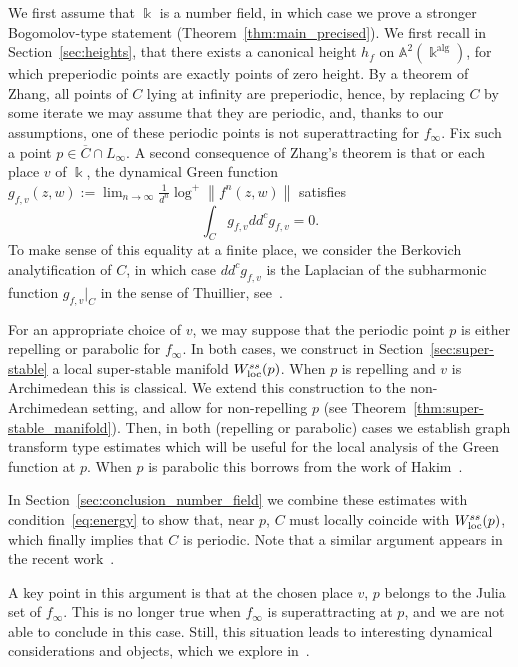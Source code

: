 \documentclass[11 pt, oneside, a4paper]{amsart}
\newcommand{\A}{\mathbb{A}}
\newcommand{\norm}[1]{\left\|#1\right\|}
\newcommand{\loc}{\mathrm{loc}}
\newcommand{\nk}{\Bbbk}
\DeclareMathOperator{\alg}{alg}
\theoremstyle{definition}
\theoremstyle{definition}
\begin{document}
 We first assume that 
 $\nk$ is a number field, in which case we prove a stronger Bogomolov-type statement (Theorem~\ref{thm:main_precised}). 
We first recall in Section~\ref{sec:heights}, that  there exists  a canonical height
$h_f$  on $\A^2(\nk^{\alg})$, 
for which preperiodic points are exactly points of zero height. 
By a theorem of Zhang, all points of $C$ lying at infinity are  preperiodic, hence, 
by replacing $C$ by some iterate 
we may assume that they are periodic, and,  
thanks to our assumptions, one of these periodic points  
 is not superattracting for $f_\infty$.  Fix such a   point $p\in \overline C \cap L_\infty$.
A second consequence of Zhang's theorem is that or each place $v$ of $\nk$,
 the dynamical Green function $g_{f,v}(z,w) := \lim_{n\to\infty} \frac1{d^n} \log^+ \norm{f^n(z,w)}$
satisfies 
\begin{equation} \label{eq:energy}
\int_{C} g_{f,v} dd^c g_{f,v}=0.
\end{equation} 
To make sense of this equality at
  a finite place,  we consider  the Berkovich analytification of $C$, in which case $dd^c  g_{f,v}$ is 
 the Laplacian of the subharmonic function 
$g_{f,v}|_C$ in the sense of Thuillier, see~\cite{thuillier:phdthesis}. 

For an appropriate choice of $v$, 
 we may suppose that  the  periodic
  point  $p$   is either repelling or parabolic for $f_\infty$. 
 In both cases, we construct in Section~\ref{sec:super-stable}  
 a local super-stable manifold $W^{\rm ss}_{\loc}(p)$. 
  When $p$ is repelling and $v$ is Archimedean this is classical. 
We extend this construction to  the non-Archimedean setting, and allow for non-repelling $p$ 
(see Theorem~\ref{thm:super-stable_manifold}). 
Then, in both (repelling or parabolic) cases we establish 
 graph transform type estimates which will be useful for the local analysis of the Green function at $p$. 
 When $p$ is parabolic this borrows from the work of  Hakim~\cite{hakim}. 

In Section~\ref{sec:conclusion_number_field}  we combine these estimates with condition~\eqref{eq:energy} to show that, near $p$, 
   $C$ must locally coincide with $W^{\rm ss}_{\loc}(p)$, 
 which finally implies that  $C$ is periodic.   
Note that a similar argument appears in the recent work~\cite{gauthier-taflin-vigny:sparsity}. 
 
 
A key point in this argument is that at the chosen place $v$, $p$ belongs to the Julia set of $f_\infty$. 
This is no longer true when $f_\infty$ is superattracting at $p$, and we are not able to conclude in this case. 
{Still, this situation leads to interesting dynamical considerations and objects, which we explore in~\cite{DFR2}.}
\end{document}
